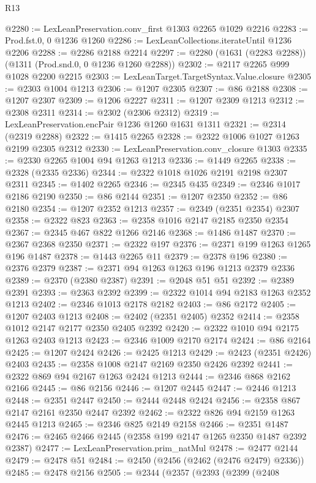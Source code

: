 \begin{lexlean}{R13}
\begin{coremodule}
@2280 := LexLeanPreservation.conv_first @1303 @2265 @1029 @2216
@2283 := Prod.fst.{0, 0} @1236 @1260
@2286 := LexLeanCollections.iterateUntil @1236 @2206
@2288 := @2286 @2188 @2214
@2297 := @2280 (@1631 (@2283 @2288)) (@1311 (Prod.snd.{0, 0} @1236 @1260 @2288))
@2302 := @2117 @2265 @999 @1028 @2200 @2215
@2303 := LexLeanTarget.TargetSyntax.Value.closure
@2305 := @2303 @1004 @1213
@2306 := @1207 @2305
@2307 := @86 @2188
@2308 := @1207 @2307
@2309 := @1206 @2227
@2311 := @1207 @2309 @1213
@2312 := @2308 @2311
@2314 := @2302 (@2306 @2312)
@2319 := LexLeanPreservation.encPair @1236 @1260 @1631 @1311
@2321 := @2314 (@2319 @2288)
@2322 := @1415 @2265
@2328 := @2322 @1006 @1027 @1263 @2199 @2305 @2312
@2330 := LexLeanPreservation.conv_closure @1303
@2335 := @2330 @2265 @1004 @94 @1263 @1213
@2336 := @1449 @2265
@2338 := @2328 (@2335 @2336)
@2344 := @2322 @1018 @1026 @2191 @2198 @2307 @2311
@2345 := @1402 @2265
@2346 := @2345 @435
@2349 := @2346 @1017 @2186 @2190
@2350 := @86 @2144
@2351 := @1207 @2350
@2352 := @86 @2180
@2354 := @1207 @2352 @1213
@2357 := @2349 (@2351 @2354) @2307
@2358 := @2322 @823
@2363 := @2358 @1016 @2147 @2185 @2350 @2354
@2367 := @2345 @467 @822 @1266 @2146
@2368 := @1486 @1487
@2370 := @2367 @2368 @2350
@2371 := @2322 @197
@2376 := @2371 @199 @1263 @1265 @196 @1487
@2378 := @1443 @2265 @11
@2379 := @2378 @196
@2380 := @2376 @2379
@2387 := @2371 @94 @1263 @1263 @196 @1213 @2379 @2336
@2389 := @2370 (@2380 @2387)
@2391 := @2048 @51 @51
@2392 := @2389 @2391
@2393 := @2363 @2392
@2399 := @2322 @1014 @94 @2183 @1263 @2352 @1213
@2402 := @2346 @1013 @2178 @2182
@2403 := @86 @2172
@2405 := @1207 @2403 @1213
@2408 := @2402 (@2351 @2405) @2352
@2414 := @2358 @1012 @2147 @2177 @2350 @2405 @2392
@2420 := @2322 @1010 @94 @2175 @1263 @2403 @1213
@2423 := @2346 @1009 @2170 @2174
@2424 := @86 @2164
@2425 := @1207 @2424
@2426 := @2425 @1213
@2429 := @2423 (@2351 @2426) @2403
@2435 := @2358 @1008 @2147 @2169 @2350 @2426 @2392
@2441 := @2322 @869 @94 @2167 @1263 @2424 @1213
@2444 := @2346 @868 @2162 @2166
@2445 := @86 @2156
@2446 := @1207 @2445
@2447 := @2446 @1213
@2448 := @2351 @2447
@2450 := @2444 @2448 @2424
@2456 := @2358 @867 @2147 @2161 @2350 @2447 @2392
@2462 := @2322 @826 @94 @2159 @1263 @2445 @1213
@2465 := @2346 @825 @2149 @2158
@2466 := @2351 @1487
@2476 := @2465 @2466 @2445 (@2358 @199 @2147 @1265 @2350 @1487 @2392 @2387)
@2477 := LexLeanPreservation.prim_natMul
@2478 := @2477 @2144
@2479 := @2478 @51
@2484 := @2450 (@2456 (@2462 (@2476 @2479) @2336))
@2485 := @2478 @2156
@2505 := @2344
    (@2357
      (@2393
        (@2399
          (@2408

\end{coremodule}
\end{lexlean}
